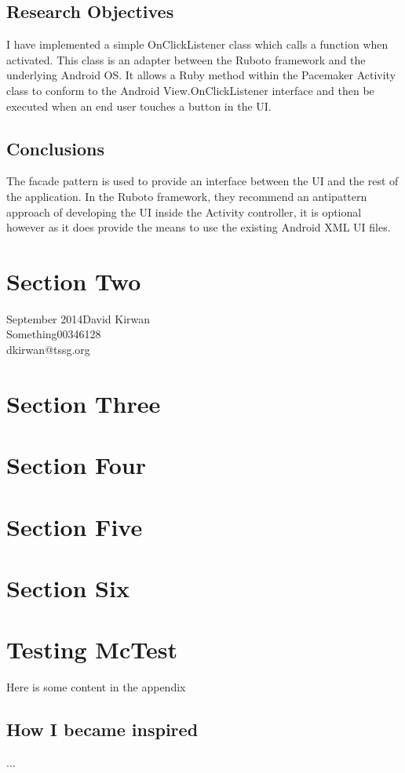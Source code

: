 \documentclass[runningheads,a4paper]{llncs}
\begin{document}
\subsection{Research Objectives}
I have implemented a simple OnClickListener class which calls a function when activated. This class is an adapter between the Ruboto framework and the underlying Android OS. It allows a Ruby method within the Pacemaker Activity class to conform to the Android View.OnClickListener interface and then be executed when an end user touches a button in the UI.
%
\newpage
%
\subsection{Conclusions}
The facade pattern is used to provide an interface between the UI and the rest of the application. In the Ruboto framework, they recommend an antipattern approach of developing the UI inside the Activity controller, it is optional however as it does provide the means to use the existing Android XML UI files.
%
\newpage
%
\section{Section Two}
\vspace{1cm}
\begin{flushright}\noindent
September 2014\hfill David Kirwan\\
Something\hfill 00346128\\
dkirwan@tssg.org
\end{flushright}
%
\newpage
%
\section{Section Three}
%
\newpage
%
\section{Section Four}
%
\newpage
%
\section{Section Five}
%
\newpage
%
\section{Section Six}
%
\newpage
%


%
\newpage
%
\appendix
\section{Testing McTest}
Here is some content in the appendix

\begin{subappendices}
\subsection{How I became inspired}
...
\end{subappendices}
\end{document}
